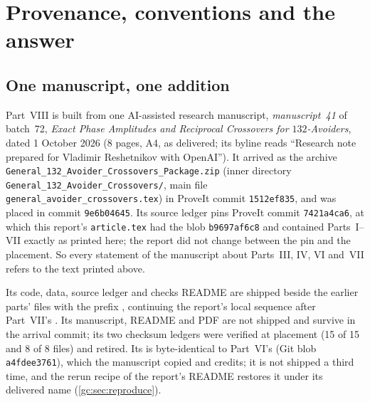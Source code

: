 \documentclass[11pt,a4paper]{article}
\theoremstyle{definition}\newaliascnt{definition}{theorem}
\theoremstyle{remark}\newaliascnt{remark}{theorem}
\begin{document}
\section{Provenance, conventions and the answer}
\label{gc:sec:intro}

\subsection{One manuscript, one addition}
\label{gc:sec:source}
Part~VIII is built from one AI-assisted research manuscript,
\emph{manuscript~41} of batch~72, \emph{Exact Phase Amplitudes and Reciprocal
Crossovers for $132$-Avoiders}, dated 1 October 2026 (8 pages, A4, as
delivered; its byline reads ``Research note prepared for Vladimir Reshetnikov
with OpenAI''). It arrived as the archive
\texttt{General\_132\_Avoider\_Crossovers\_Package.zip} (inner directory
\texttt{General\_132\_Avoider\_Crossovers/}, main file
\texttt{general\_avoider\_crossovers.tex}) in ProveIt commit
\texttt{1512ef835}, and was placed in commit \texttt{9e6b04645}. Its source
ledger pins ProveIt commit \texttt{7421a4ca6}, at which this report's
\texttt{article.tex} had the blob \texttt{b9697af6c8} and contained
Parts~I--VII exactly as printed here; the report did not change between the
pin and the placement. So every statement of the manuscript about Parts~III,
IV, VI and~VII refers to the text printed above.

Its code, data, source ledger and checks README are shipped beside the earlier
parts' files with the prefix , continuing the
report's local sequence after Part~VII's . Its
manuscript, README and PDF are not shipped and survive in the arrival commit;
its two checksum ledgers were verified at placement (15 of 15 and 8 of 8
files) and retired. Its  is byte-identical to Part~VI's
 (Git blob \texttt{a4fdee3761}), which
the manuscript copied and credits; it is not shipped a third time, and the
rerun recipe of the report's README restores it under its delivered name
(\cref{gc:sec:reproduce}).
\end{document}
